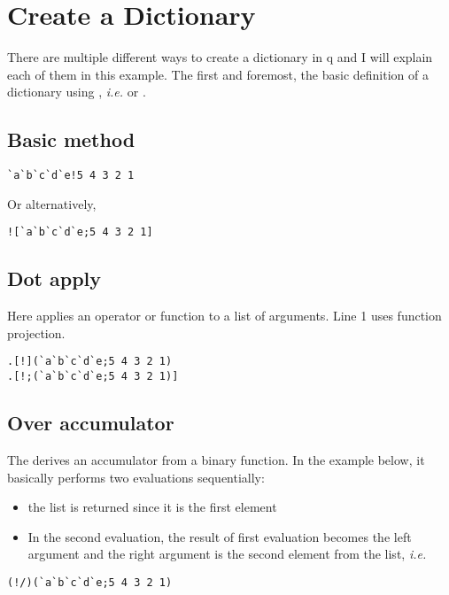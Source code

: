 \section{Create a Dictionary}

There are multiple different ways to create a dictionary in q and I will explain each of them in this example. The first and foremost, the basic definition of a dictionary using \q{!}, \emph{i.e.}  or \q{![x;y]}.


\subsection{Basic method}
\begin{verbatim}
`a`b`c`d`e!5 4 3 2 1
\end{verbatim}

Or alternatively,
\begin{verbatim}
![`a`b`c`d`e;5 4 3 2 1]
\end{verbatim}


\subsection{Dot apply}
Here  applies an operator or function to a list of arguments. Line 1 uses function projection.

\begin{verbatim}
.[!](`a`b`c`d`e;5 4 3 2 1)
.[!;(`a`b`c`d`e;5 4 3 2 1)]
\end{verbatim}


\subsection{Over accumulator}
The  derives an accumulator from a binary function. In the example below, it basically performs two evaluations sequentially:
\begin{itemize}
\item the list  is returned since it is the first element
\item In the second evaluation, the result of first evaluation becomes the left argument and the right argument is the second element from the list, \emph{i.e.} 
\end{itemize}
\begin{verbatim}
(!/)(`a`b`c`d`e;5 4 3 2 1)
\end{verbatim}


